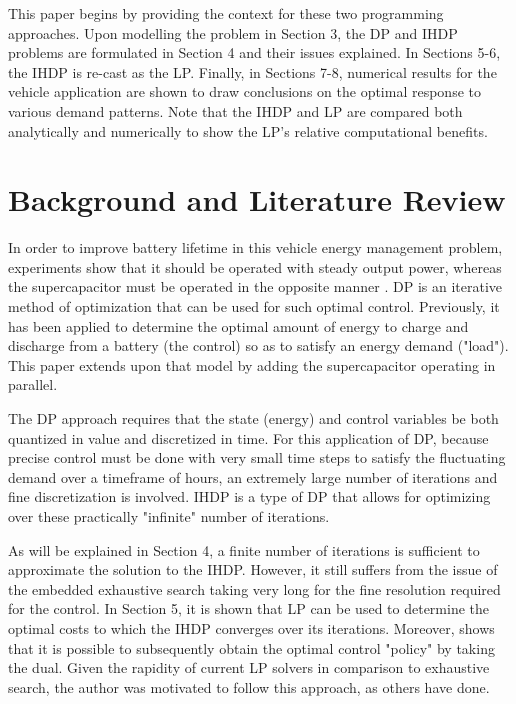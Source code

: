 \documentclass[conference]{IEEEtran}
\begin{document}
This paper begins by providing the context for these two programming approaches. Upon modelling the problem in Section 3, the DP and IHDP problems are formulated in Section 4 and their issues explained. In Sections 5-6, the IHDP is re-cast as the LP. Finally, in Sections 7-8, numerical results for the vehicle application are shown to draw conclusions on the optimal response to various demand patterns. Note that the IHDP and LP are compared both analytically and numerically to show the LP's relative computational benefits.


\section{Background and Literature Review}
In order to improve battery lifetime in this vehicle energy management problem, experiments \cite{thounthong2009energy} show that it should be operated with steady output power, whereas the supercapacitor must be operated in the opposite manner \cite{thounthong2009energy}. DP is an iterative method of optimization that can be used for such optimal control. Previously\cite{thounthong2009energy}, it has been applied to determine the optimal amount of energy to charge and discharge from a battery (the control) so as to satisfy an energy demand ("load"). This paper extends upon that model by adding the supercapacitor operating in parallel.

The DP approach requires that the state (energy) and control variables be both quantized in value and discretized in time. For this application of DP, because precise control must be done with very small time steps to satisfy the fluctuating demand over a timeframe of hours, an extremely large number of iterations and fine discretization is involved.\cite{bertsekas1995dynamic} IHDP is a type of DP that allows for optimizing over these practically "infinite" number of iterations.

As will be explained in Section 4, a finite number of iterations is sufficient to approximate the solution to the IHDP.\cite{bertsekas1995dynamic} However, it still suffers from the issue of the embedded exhaustive search taking very long for the fine resolution required for the control. In Section 5, it is shown that LP can be used to determine the optimal costs to which the IHDP converges over its iterations.\cite{bertsekas1995dynamic} Moreover, \cite{4220813} shows that it is possible to subsequently obtain the optimal control "policy" by taking the dual. Given the rapidity of current LP solvers in comparison to exhaustive search, the author was motivated to follow this approach, as others have done.
\end{document}
